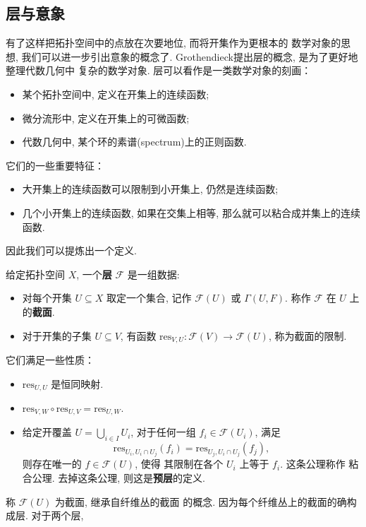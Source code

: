 \subsection{层与意象}
有了这样把拓扑空间中的点放在次要地位, 而将开集作为更根本的
数学对象的思想, 我们可以进一步引出意象的概念了.
Grothendieck提出层的概念, 是为了更好地整理代数几何中
复杂的数学对象. 层可以看作是一类数学对象的刻画：
\begin{itemize}
\item 某个拓扑空间中, 定义在开集上的连续函数;
\item 微分流形中, 定义在开集上的可微函数;
\item 代数几何中, 某个环的素谱(spectrum)上的正则函数.~\cite[第二章, 例1.0.1]{hartshorne:1977:ag}
\end{itemize}
它们的一些重要特征：
\begin{itemize}
\item 大开集上的连续函数可以限制到小开集上, 仍然是连续函数;
\item 几个小开集上的连续函数, 如果在交集上相等, 那么就可以粘合成并集上的连续函数.
\end{itemize}
因此我们可以提炼出一个定义.
\begin{definition}
给定拓扑空间 \(X\), 一个\textbf{层} \(\mathscr F\) 是一组数据:
\begin{itemize}
\item 对每个开集 \(U \subseteq X\) 取定一个集合,
记作 \(\mathscr F(U)\) 或 \(\Gamma(U, F)\).
称作 \(\mathscr F\) 在 \(U\) 上的\textbf{截面}.
\item 对于开集的子集 \(U \subseteq V\), 有函数
\(\mathrm{res}_{V,U} : \mathscr F(V) \to \mathscr F(U)\),
称为截面的限制.
\end{itemize}
它们满足一些性质：
\begin{itemize}
\item \(\mathrm{res}_{U,U}\) 是恒同映射.
\item \(\mathrm{res}_{V, W}\circ \mathrm{res}_{U,V} = \mathrm{res}_{U, W}\).
\item 给定开覆盖 \(U = \bigcup_{i\in I} U_i\),
对于任何一组 \(f_i \in \mathscr F(U_i)\), 满足
\[\mathrm{res}_{U_i, U_i \cap U_j}(f_i)
= \mathrm{res}_{U_j, U_i \cap U_j}(f_j),\]
则存在唯一的 \(f \in \mathscr F(U)\), 使得
其限制在各个 \(U_i\) 上等于 \(f_i\). 这条公理称作
粘合公理. 去掉这条公理, 则这是\textbf{预层}的定义.
\end{itemize}
\end{definition}
称 \(\mathscr F(U)\) 为截面, 继承自纤维丛的截面
的概念. 因为每个纤维丛上的截面的确构成层. 对于两个层,
